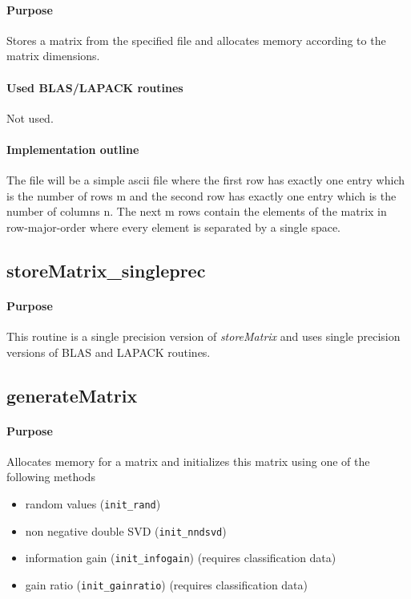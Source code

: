 \documentclass[a4paper,10pt]{scrartcl}
\begin{document}
			\paragraph{Purpose}

			Stores a matrix from the specified file and allocates memory according to the matrix 
			dimensions.

			\paragraph{Used BLAS/LAPACK routines}

			Not used.

			\paragraph{Implementation outline}

			The file will be a simple ascii file where the first row has exactly one entry which is the 
			number of rows m and the second row has exactly one entry which is the number of columns n.
 			The next m rows contain the elements of the matrix in row-major-order where every element is 
			separated by a single space.

		\subsection{storeMatrix\_singleprec}

			\paragraph{Purpose}

			This routine is a single precision version of \emph{storeMatrix} and uses single precision versions
			of BLAS and LAPACK routines.


		\subsection{generateMatrix}

			\paragraph{Purpose}

			Allocates memory for a matrix and initializes this matrix using one of the following methods

			\begin{itemize}
			 \item random values (\texttt{init\_rand})
			 \item non negative double SVD (\texttt{init\_nndsvd})
			  \item information gain (\texttt{init\_infogain}) (requires classification data)
			  \item gain ratio (\texttt{init\_gainratio}) (requires classification data)
			\end{itemize}
\end{document}
